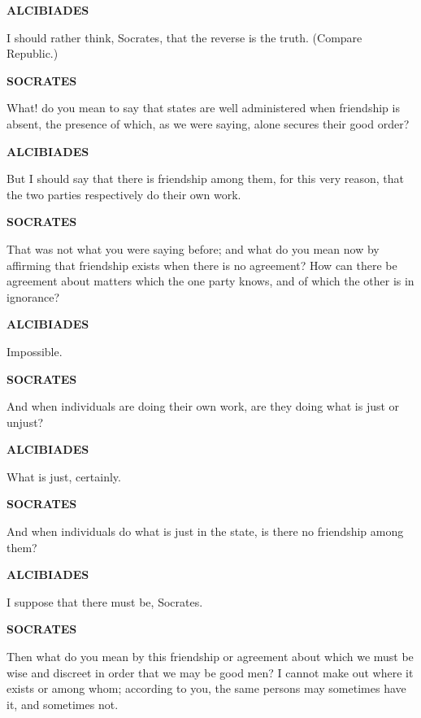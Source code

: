 \documentclass[11pt,letter]{article}
\begin{document}
\par \textbf{ALCIBIADES}
\par   I should rather think, Socrates, that the reverse is the truth. (Compare Republic.)

\par \textbf{SOCRATES}
\par   What! do you mean to say that states are well administered when friendship is absent, the presence of which, as we were saying, alone secures their good order?

\par \textbf{ALCIBIADES}
\par   But I should say that there is friendship among them, for this very reason, that the two parties respectively do their own work.

\par \textbf{SOCRATES}
\par   That was not what you were saying before; and what do you mean now by affirming that friendship exists when there is no agreement? How can there be agreement about matters which the one party knows, and of which the other is in ignorance?

\par \textbf{ALCIBIADES}
\par   Impossible.

\par \textbf{SOCRATES}
\par   And when individuals are doing their own work, are they doing what is just or unjust?

\par \textbf{ALCIBIADES}
\par   What is just, certainly.

\par \textbf{SOCRATES}
\par   And when individuals do what is just in the state, is there no friendship among them?

\par \textbf{ALCIBIADES}
\par   I suppose that there must be, Socrates.

\par \textbf{SOCRATES}
\par   Then what do you mean by this friendship or agreement about which we must be wise and discreet in order that we may be good men? I cannot make out where it exists or among whom; according to you, the same persons may sometimes have it, and sometimes not.
\end{document}
